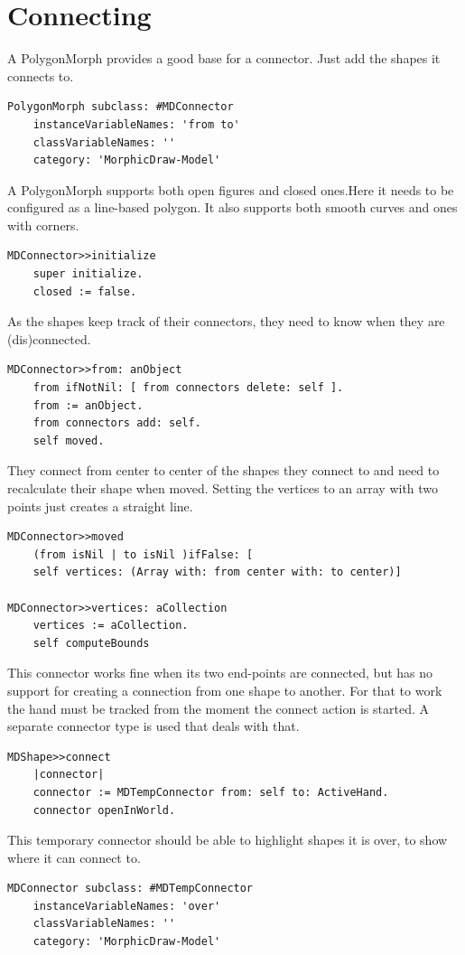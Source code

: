 \documentclass[10pt, twoside]{article}   	%
\begin{document}
\section{Connecting}
A PolygonMorph provides a good base for a connector.
Just add the shapes it connects to.
\begin{verbatim}
PolygonMorph subclass: #MDConnector
    instanceVariableNames: 'from to'
    classVariableNames: ''
    category: 'MorphicDraw-Model'
\end{verbatim}
A PolygonMorph supports both open 
figures and closed ones.Here it needs to be configured 
as a line-based polygon. It also supports both
smooth curves and ones with corners.
\begin{verbatim}
MDConnector>>initialize
    super initialize.
    closed := false.
\end{verbatim}
As the shapes keep track of their connectors, they need
to know when they are (dis)connected.
\begin{verbatim}
MDConnector>>from: anObject
    from ifNotNil: [ from connectors delete: self ].
    from := anObject.
    from connectors add: self.
    self moved.
\end{verbatim}
They connect from center to center of the shapes they connect to
and need to recalculate their shape when moved. Setting the 
vertices to an array with two points just creates a straight line.
\begin{verbatim}
MDConnector>>moved
    (from isNil | to isNil )ifFalse: [
    self vertices: (Array with: from center with: to center)]

MDConnector>>vertices: aCollection
	vertices := aCollection.
	self computeBounds
\end{verbatim}
This connector works fine when its two end-points are connected,
but has no support for creating a connection from one shape to 
another. For that to work the hand must be tracked from the
moment the connect action is started. A separate connector
type is used that deals with that.
\begin{verbatim}
MDShape>>connect
    |connector|
    connector := MDTempConnector from: self to: ActiveHand.
    connector openInWorld.
\end{verbatim}
This temporary connector should be able to highlight shapes it is 
over, to show where it can connect to.
\begin{verbatim}
MDConnector subclass: #MDTempConnector
    instanceVariableNames: 'over'
    classVariableNames: ''
    category: 'MorphicDraw-Model'
\end{verbatim}
\end{document}
